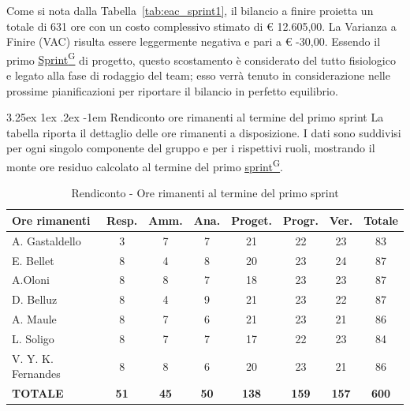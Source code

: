 \documentclass[a4paper,12pt]{article}
\makeatletter
\newcounter{subsubsubsection}[subsubsection]
\renewcommand\paragraph{\@startsection{paragraph}{5}{\z@}%
  {3.25ex \@plus1ex \@minus.2ex}%
  {-1em}%
  {\normalfont\normalsize\bfseries}}
\providecommand{\glslink}[2]{\href{https://alittlebyte-19.github.io/Documentazione/glossario.html\#gls-#1}{\underline{#2}\textsuperscript{\scriptsize G}}}
\makeatother
\begin{document}
Come si nota dalla Tabella~\ref{tab:eac_sprint1}, il bilancio a finire proietta un totale di 631 ore con un costo complessivo stimato di € 12.605,00. La Varianza a Finire (VAC) risulta essere leggermente negativa e pari a € -30,00. Essendo il primo \glslink{sprint}{Sprint} di progetto, questo scostamento è considerato del tutto fisiologico e legato alla fase di rodaggio del team; esso verrà tenuto in considerazione nelle prossime pianificazioni per riportare il bilancio in perfetto equilibrio.


\paragraph{Rendiconto ore rimanenti al termine del primo sprint}
La tabella riporta il dettaglio delle ore rimanenti a disposizione. I dati sono suddivisi per ogni singolo componente del gruppo e per i rispettivi ruoli, mostrando il monte ore residuo calcolato al termine del primo \glslink{sprint}{sprint}.

\begin{table}[htbp]
\centering
\renewcommand{\arraystretch}{1.5} 
\begin{tabularx}{\textwidth}{|X|c|c|c|c|c|c|c|}
\hline
\textbf{Ore rimanenti} & \textbf{Resp.} & \textbf{Amm.} & \textbf{Ana.} & \textbf{Proget.} & \textbf{Progr.} & \textbf{Ver.} & \textbf{Totale} \\
\hline
A. Gastaldello & 3 & 7 & 7 & 21 & 22 & 23 & 83 \\
\hline
E. Bellet & 8 & 4 & 8 & 20 & 23 & 24 & 87 \\
\hline
A.Oloni & 8 & 8 & 7 & 18 & 23 & 23 & 87 \\
\hline
D. Belluz & 8 & 4 & 9 & 21 & 23 & 22 & 87 \\
\hline
A. Maule & 8 & 7 & 6 & 21 & 23 & 21 & 86 \\
\hline
L. Soligo & 8 & 7 & 7 & 17 & 22 & 23 & 84 \\
\hline
V. Y. K. Fernandes & 8 & 8 & 6 & 20 & 23 & 21 & 86 \\
\hline
\rowcolor{gray!20}
\textbf{TOTALE} & \textbf{51} & \textbf{45} & \textbf{50} & \textbf{138} & \textbf{159} & \textbf{157} & \textbf{600} \\
\hline
\end{tabularx}
\caption{Rendiconto - Ore rimanenti al termine del primo sprint}
\end{table}


\newpage

\end{document}
